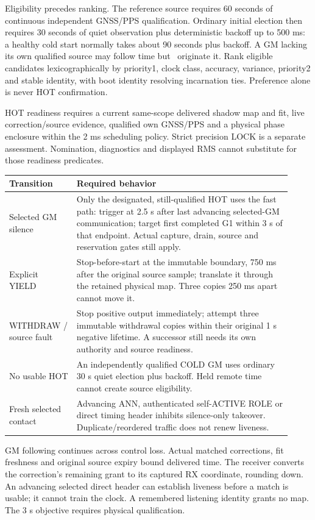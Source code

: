 \documentclass[11pt,letterpaper]{article}
\begin{document}
Eligibility precedes ranking. The reference source requires 60 seconds of continuous independent GNSS/PPS qualification. Ordinary initial election then requires 30 seconds of quiet observation plus deterministic backoff up to 500 ms: a healthy cold start normally takes about 90 seconds plus backoff. A GM lacking its own qualified source may follow time but \mustnot\ originate it. Rank eligible candidates lexicographically by priority1, clock class, accuracy, variance, priority2 and stable identity, with boot identity resolving incarnation ties. Preference alone is never HOT confirmation.

HOT readiness requires a current same-scope delivered shadow map and fit, live correction/source evidence, qualified own GNSS/PPS and a physical phase enclosure within the 2 ms scheduling policy. Strict precision LOCK is a separate assessment. Nomination, diagnostics and displayed RMS cannot substitute for those readiness predicates.

\begin{center}\small
\begin{tabular}{@{}L{0.22\linewidth}L{0.70\linewidth}@{}}\toprule
Transition & Required behavior\\\midrule
Selected GM silence & Only the designated, still-qualified HOT uses the fast path: trigger at 2.5 s after last advancing selected-GM communication; target first completed G1 within 3 s of that endpoint. Actual capture, drain, source and reservation gates still apply.\\
Explicit YIELD & Stop-before-start at the immutable boundary, 750 ms after the original source sample; translate it through the retained physical map. Three copies 250 ms apart cannot move it.\\
WITHDRAW / source fault & Stop positive output immediately; attempt three immutable withdrawal copies within their original 1 s negative lifetime. A successor still needs its own authority and source readiness.\\
No usable HOT & An independently qualified COLD GM uses ordinary 30 s quiet election plus backoff. Held remote time cannot create source eligibility.\\
Fresh selected contact & Advancing ANN, authenticated self-ACTIVE ROLE or direct timing header inhibits silence-only takeover. Duplicate/reordered traffic does not renew liveness.\\
\bottomrule\end{tabular}\end{center}
GM following continues across control loss. Actual matched corrections, fit freshness and original source expiry bound delivered time. The receiver converts the correction's remaining grant to its captured RX coordinate, rounding down. An advancing selected direct header can establish liveness before a match is usable; it cannot train the clock. A remembered listening identity grants no map. The 3 s objective requires physical qualification.
\end{document}
